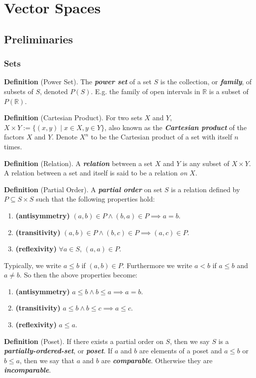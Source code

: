 \section{Vector Spaces}

\subsection{Preliminaries}

\subsubsection{Sets}
\textbf{Definition} (Power Set). The \textbf{\textit{power set}} of a set $S$ is the collection, or \textbf{\textit{family}}, of subsets of $S$, denoted $P(S)$. E.g. the family of open intervals in $\mathbb{R}$ is a subset of $P(\mathbb{R})$.

\textbf{Definition} (Cartesian Product). For two sets $X$ and $Y$, $X\times Y:=\{(x,y)\mid x\in X, y\in Y\}$, also known as the \textbf{\textit{Cartesian product}} of the factors $X$ and $Y$. Denote $X^n$ to be the Cartesian product of a set with itself $n$ times.

\textbf{Definition} (Relation). A \textbf{\textit{relation}} between a set $X$ and $Y$ is any subset of $X\times Y$. A relation between a set and itself is said to be a relation \textit{on} $X$. 

\textbf{Definition} (Partial Order). A \textbf{\textit{partial order}} on set $S$ is a relation defined by $P\subseteq S\times S$ such that the following properties hold:
\begin{enumerate}
    \item \textbf{(antisymmetry)} $(a,b)\in P\wedge(b,a)\in P\implies a=b$.
    \item \textbf{(transitivity)} $(a,b)\in P\wedge(b,c)\in P\implies(a,c)\in P$.
    \item \textbf{(reflexivity)} $\forall a\in S$, $(a,a)\in P$.
\end{enumerate}
Typically, we write $a\leq b$ if $(a,b)\in P$. Furthermore we write $a<b$ if $a\leq b$ and $a\neq b$. So then the above properties become:
\begin{enumerate}
    \item \textbf{(antisymmetry)} $a\leq b\wedge b\leq a\implies a=b$.
    \item \textbf{(transitivity)} $a\leq b\wedge b\leq c\implies a\leq c$.
    \item \textbf{(reflexivity)} $a\leq a$.
\end{enumerate}
\textbf{Definition} (Poset). If there exists a partial order on $S$, then we say $S$ is a \textbf{\textit{partially-ordered-set}}, or \textbf{\textit{poset}}. If $a$ and $b$ are elements of a poset and $a\leq b$ or $b\leq a$, then we say that $a$ and $b$ are \textbf{\textit{comparable}}. Otherwise they are \textbf{\textit{incomparable}}.

